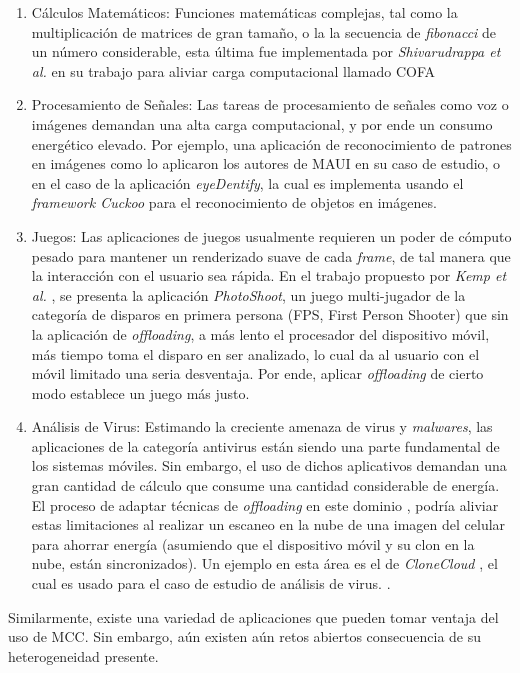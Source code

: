  \begin{enumerate}
  \item Cálculos Matemáticos: Funciones matemáticas complejas, tal como la multiplicación de matrices de gran tamaño, o la 
  la secuencia de \textit{fibonacci} de un número considerable, esta última fue implementada por \textit{Shivarudrappa et al.} en su trabajo
  para aliviar carga computacional llamado COFA \cite{shivarudrappa2011cofa} 
  \item Procesamiento de Señales: Las tareas de procesamiento de señales como voz o imágenes demandan una alta carga computacional, y por ende 
  un consumo energético elevado. Por ejemplo, una aplicación de reconocimiento de patrones en imágenes como lo aplicaron los autores de MAUI 
  \cite{Cuervo:2010:MMS:1814433.1814441} en su caso de estudio, o en el caso de la aplicación \textit{eyeDentify}, la cual es 
  implementa usando el \textit{framework Cuckoo} \cite{kemp2012cuckoo} para el reconocimiento de objetos en imágenes. 
  \item Juegos: Las aplicaciones de juegos usualmente requieren un poder de cómputo pesado para mantener un renderizado suave de cada
  \textit{frame}, de tal manera
  que la interacción con el usuario sea rápida. En el trabajo propuesto por \textit{Kemp et al.} \cite{kemp2012cuckoo}, se presenta la aplicación
  \textit{PhotoShoot}, un juego multi-jugador de la categoría de disparos en primera persona (FPS, First Person Shooter) que sin la aplicación de 
  \textit{offloading}, a más lento el procesador del dispositivo móvil, más tiempo toma el disparo en ser analizado, lo cual da al usuario 
  con el móvil limitado una seria desventaja. Por ende, aplicar \textit{offloading} de cierto modo establece un juego más justo.
  \item Análisis de Virus: Estimando la creciente amenaza de virus y \textit{malwares}, las aplicaciones de la categoría antivirus están siendo
  una parte fundamental de los sistemas móviles. Sin embargo, el uso de dichos aplicativos demandan una gran cantidad de cálculo que consume
  una cantidad considerable de energía. El proceso de adaptar técnicas de \textit{offloading} en este dominio , podría aliviar estas limitaciones
  al realizar un escaneo 
  en la nube de una imagen del celular para ahorrar energía (asumiendo que el dispositivo móvil y su clon en la nube, están sincronizados). 
  Un ejemplo en esta área es el de \textit{CloneCloud} \cite{chun2011clonecloud}, el cual es usado para el caso de estudio de análisis de virus. 
  \cite{DBLP:journals/corr/abs-1105-3232}. 
  
 \end{enumerate}

 
  Similarmente, existe una variedad de aplicaciones que pueden tomar ventaja del uso de MCC. Sin embargo, aún existen aún retos abiertos consecuencia
  de su heterogeneidad presente.
 



























